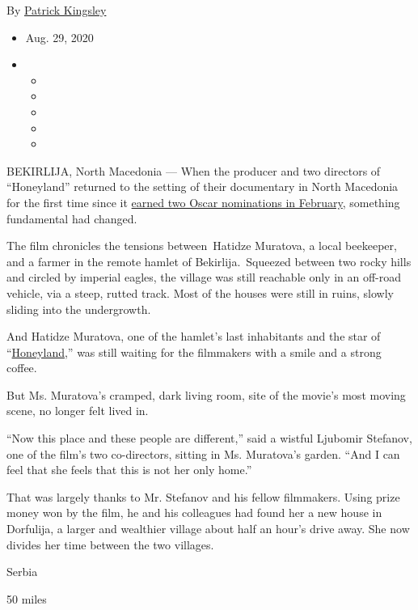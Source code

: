 By \href{https://www.nytimes3xbfgragh.onion/by/patrick-kingsley}{Patrick
Kingsley}

\begin{itemize}
\item
  Aug. 29, 2020
\item
  \begin{itemize}
  \item
  \item
  \item
  \item
  \item
  \end{itemize}
\end{itemize}

BEKIRLIJA, North Macedonia --- When the producer and two directors of
``Honeyland'' returned to the setting of their documentary in North
Macedonia for the first time since it
\href{https://www.nytimes3xbfgragh.onion/2020/01/24/movies/honeyland-oscars.html}{earned
two Oscar nominations in February}, something fundamental had changed.

The film chronicles the tensions between~Hatidze Muratova, a local
beekeeper, and a farmer in the remote hamlet of Bekirlija.~Squeezed
between two rocky hills and circled by imperial eagles, the village was
still reachable only in an off-road vehicle, via a steep, rutted track.
Most of the houses were still in ruins, slowly sliding into the
undergrowth.

And Hatidze Muratova, one of the hamlet's last inhabitants and the star
of
``\href{https://www.nytimes3xbfgragh.onion/2019/07/25/movies/honeyland-review.html}{Honeyland},''
was still waiting for the filmmakers with a smile and a strong coffee.

But Ms. Muratova's cramped, dark living room, site of the movie's most
moving scene, no longer felt lived in.

``Now this place and these people are different,'' said a wistful
Ljubomir Stefanov, one of the film's two co-directors, sitting in Ms.
Muratova's garden. ``And I can feel that she feels that this is not her
only home.''

That was largely thanks to Mr. Stefanov and his fellow filmmakers. Using
prize money won by the film, he and his colleagues had found her a new
house in Dorfulija, a larger and wealthier village about half an hour's
drive away. She now divides her time between the two villages.

Serbia

50 miles

